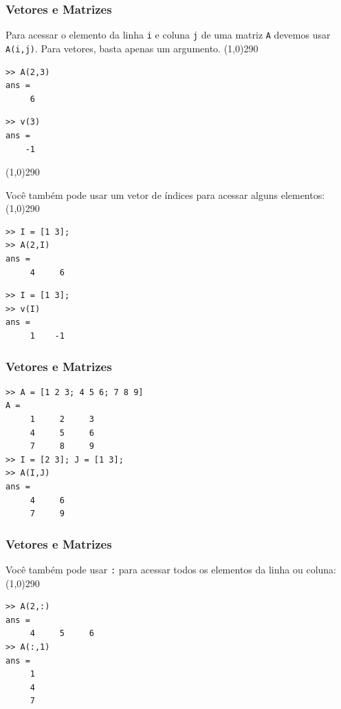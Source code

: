 \documentclass{beamer}
\newcommand{\delim}{\line(1,0){290}}
\begin{document}
\begin{frame}[fragile]
\frametitle{Vetores e Matrizes}
Para acessar o elemento da linha {\tt i} e coluna {\tt j} de uma matriz {\tt A} devemos usar {\tt A(i,j)}. Para vetores, basta apenas um argumento.
\pause
\delim
\begin{center}
\begin{minipage}{4 cm}
\begin{verbatim}
>> A(2,3)
ans =
     6
\end{verbatim}
\end{minipage}
\begin{minipage}{4 cm}
\begin{verbatim}
>> v(3)
ans =
    -1
\end{verbatim}
\end{minipage}
\end{center}
\delim
\pause

Voc\^e tamb\'em pode usar um vetor de \'indices para acessar alguns elementos:
\pause
\delim
\begin{center}
\begin{minipage}{4 cm}
\begin{verbatim}
>> I = [1 3];
>> A(2,I)
ans =
     4     6
\end{verbatim}
\end{minipage}
\begin{minipage}{4 cm}
\begin{verbatim}
>> I = [1 3];
>> v(I)
ans =
     1    -1
\end{verbatim}
\end{minipage}
\end{center}


\end{frame}

\begin{frame}[fragile]
\frametitle{Vetores e Matrizes}
\begin{verbatim}
>> A = [1 2 3; 4 5 6; 7 8 9]
A =
     1     2     3
     4     5     6
     7     8     9
>> I = [2 3]; J = [1 3];
>> A(I,J)
ans =
     4     6
     7     9
\end{verbatim}

\end{frame}
\begin{frame}[fragile]
\frametitle{Vetores e Matrizes}
Voc\^e tamb\'em pode usar {\tt :} para acessar todos os elementos da linha ou coluna:
\pause
\delim
\begin{verbatim}
>> A(2,:)
ans =
     4     5     6
>> A(:,1)
ans =
     1
     4
     7
\end{verbatim}

\end{frame}
\end{document}
